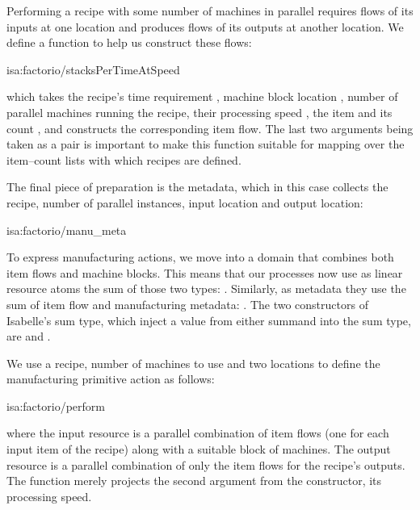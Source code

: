 \documentclass[class=smolathesis,crop=false]{standalone}
\begin{document}
Performing a recipe with some number of machines in parallel requires flows of its inputs at one location and produces flows of its outputs at another location.
We define a function to help us construct these flows:
\begin{isadef}{isa:factorio/stacksPerTimeAtSpeed}
  
\end{isadef}
\noindent
which takes the recipe's time requirement , machine block location , number  of parallel machines running the recipe, their processing speed , the item  and its count , and constructs the corresponding item flow.
The last two arguments being taken as a pair is important to make this function suitable for mapping over the item--count lists with which recipes are defined.

The final piece of preparation is the metadata, which in this case collects the recipe, number of parallel instances, input location and output location:
\begin{isadef}{isa:factorio/manu_meta}
  
\end{isadef}

To express manufacturing actions, we move into a domain that combines both item flows and machine blocks.
This means that our processes now use as linear resource atoms the sum of those two types: .
Similarly, as metadata they use the sum of item flow and manufacturing metadata: .
The two constructors of Isabelle's sum type, which inject a value from either summand into the sum type, are  and .

We use a recipe, number of machines to use and two locations to define the manufacturing primitive action  as follows:
\begin{isadef}{isa:factorio/perform}
  
\end{isadef}
\noindent
where the input resource is a parallel combination of item flows (one for each input item of the recipe) along with a suitable block of machines.
The output resource is a parallel combination of only the item flows for the recipe's outputs.
The function  merely projects the second argument from the  constructor, its processing speed.
\end{document}
